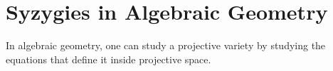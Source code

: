 \documentclass[11pt,openany]{article}
\begin{document}
%
%
%
%
%

\section{Syzygies in Algebraic Geometry}

In algebraic geometry, one can study a projective variety by studying the equations that define it inside projective space. 
%
\end{document}
